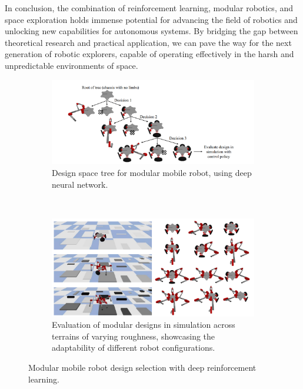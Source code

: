 In conclusion, the combination of reinforcement learning, modular robotics, and space exploration holds immense potential for advancing the field of robotics and unlocking new capabilities for autonomous systems. By bridging the gap between theoretical research and practical application, we can pave the way for the next generation of robotic explorers, capable of operating effectively in the harsh and unpredictable environments of space.

\begin{figure}[t]
    \centering
    \begin{subfigure}{1.0\textwidth}
        \centering
        \includegraphics[width=140mm]{./fig/chap5/modularlegDRLtree.png}
        \caption{Design space tree for modular mobile robot, using deep neural network.}
        \label{moduleDRLtree}
    \end{subfigure}
    \\
    \begin{subfigure}{1.0\textwidth}
        \centering
        \includegraphics[width=140mm]{./fig/chap5/modularlegDRL.png}
        \caption{Evaluation of modular designs in simulation across terrains of varying roughness, showcasing the adaptability of different robot configurations.}
        \label{modularDRL}
    \end{subfigure}
    \vspace{2mm}
    \caption{Modular mobile robot design selection with deep reinforcement learning. \cite{modularlegDRL}}
    \label{DRLmodular}
\end{figure}


